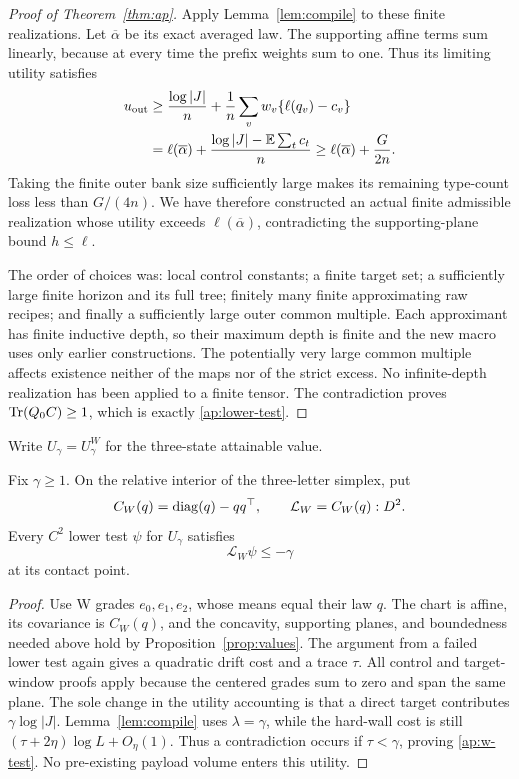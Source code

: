 \begin{proof}[Proof of Theorem~\ref{thm:ap}]
Apply Lemma~\ref{lem:compile} to these finite realizations.  Let
\(\overline\alpha\) be its exact averaged law.  The supporting affine
terms sum linearly, because at every time the prefix weights sum to one.
Thus its limiting utility satisfies
\begin{align*}
 u_{\mathrm{out}}
 &\geq\frac{\log|J|}n
   +\frac1n\sum_v w_v\{\ell(q_v)-c_v\}\\
 &=\ell(\overline\alpha)
   +\frac{\log|J|-\mathbb E\sum_t c_t}{n}
 \geq\ell(\overline\alpha)+\frac{G}{2n}.
\end{align*}
Taking the finite outer bank size sufficiently large makes its remaining
type-count loss less than \(G/(4n)\).  We have therefore constructed
an actual finite admissible realization whose utility exceeds
\(\ell(\overline\alpha)\), contradicting the supporting-plane bound
\(h\leq\ell\).

The order of choices was: local control constants; a finite target set;
a sufficiently large finite horizon and its full tree; finitely many
finite approximating raw recipes; and finally a sufficiently large outer
common multiple.  Each approximant has finite inductive depth, so their
maximum depth is finite and the new macro uses only earlier constructions.
The potentially very large common multiple affects existence neither
of the maps nor of the strict excess.  No infinite-depth realization has
been applied to a finite tensor.  The contradiction proves
\(\operatorname{Tr}(Q_0C)\geq1\), which is exactly \eqref{ap:lower-test}.
\end{proof}

Write \(U_\gamma=U^W_\gamma\) for the three-state attainable value.

\begin{corollary}\label{cor:w-ap}
Fix \(\gamma\geq1\).  On the relative interior of the three-letter
simplex, put
\[
 C_W(q)=\operatorname{diag}(q)-qq^\top,
 \qquad \mathcal L_W=C_W(q):D^2.
\]
Every \(C^2\) lower test \(\psi\) for \(U_\gamma\) satisfies
\begin{equation}\label{ap:w-test}
 \mathcal L_W\psi\leq-\gamma
\end{equation}
at its contact point.
\end{corollary}

\begin{proof}
Use W grades \(e_0,e_1,e_2\), whose means equal their law \(q\).
The chart is affine, its covariance is \(C_W(q)\), and the concavity,
supporting planes, and boundedness needed above hold by
Proposition~\ref{prop:values}.  The argument from a failed lower test
again gives a quadratic drift cost and a trace \(\tau\).  All control
and target-window proofs apply because the centered grades sum to zero
and span the same plane.  The sole change in the utility accounting is
that a direct target contributes \(\gamma\log|J|\).  Lemma~\ref{lem:compile}
uses \(\lambda=\gamma\), while the hard-wall cost is still
\((\tau+2\eta)\log L+O_\eta(1)\).  Thus a contradiction occurs if
\(\tau<\gamma\), proving \eqref{ap:w-test}.  No pre-existing payload
volume enters this utility.
\end{proof}

